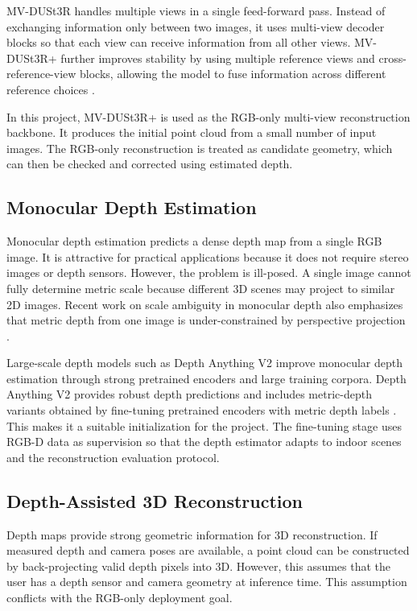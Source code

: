 \documentclass[12pt,a4paper]{article}
\newcommand{\mvd}{MV-DUSt3R}
\newcommand{\mvdp}{MV-DUSt3R+}
\newcommand{\da}{Depth Anything V2}
\begin{document}
\mvd{} handles multiple views in a single feed-forward pass. Instead of exchanging information only between two images, it uses multi-view decoder blocks so that each view can receive information from all other views. \mvdp{} further improves stability by using multiple reference views and cross-reference-view blocks, allowing the model to fuse information across different reference choices \cite{mvdust3r_paper}.

In this project, \mvdp{} is used as the RGB-only multi-view reconstruction backbone. It produces the initial point cloud from a small number of input images. The RGB-only reconstruction is treated as candidate geometry, which can then be checked and corrected using estimated depth.

\subsection{Monocular Depth Estimation}
Monocular depth estimation predicts a dense depth map from a single RGB image. It is attractive for practical applications because it does not require stereo images or depth sensors. However, the problem is ill-posed. A single image cannot fully determine metric scale because different 3D scenes may project to similar 2D images. Recent work on scale ambiguity in monocular depth also emphasizes that metric depth from one image is under-constrained by perspective projection \cite{rsa_depth}.

Large-scale depth models such as \da{} improve monocular depth estimation through strong pretrained encoders and large training corpora. \da{} provides robust depth predictions and includes metric-depth variants obtained by fine-tuning pretrained encoders with metric depth labels \cite{depthanything_project,depthanything_metric}. This makes it a suitable initialization for the project. The fine-tuning stage uses RGB-D data as supervision so that the depth estimator adapts to indoor scenes and the reconstruction evaluation protocol.

\subsection{Depth-Assisted 3D Reconstruction}
Depth maps provide strong geometric information for 3D reconstruction. If measured depth and camera poses are available, a point cloud can be constructed by back-projecting valid depth pixels into 3D. However, this assumes that the user has a depth sensor and camera geometry at inference time. This assumption conflicts with the RGB-only deployment goal.
\end{document}
